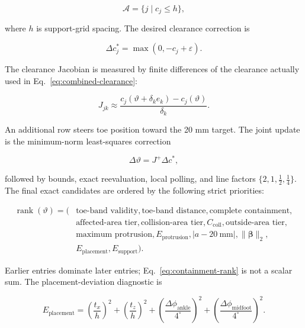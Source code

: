 \documentclass[11pt]{article}
\begin{document}
\begin{equation}
  \mathcal A=\{j\mid c_j\le h\},
\end{equation}

where $h$ is support-grid spacing. The desired clearance correction is

\begin{equation}
  \Delta c_j^*=\max(0,-c_j+\varepsilon).
\end{equation}

The clearance Jacobian is measured by finite differences of the clearance actually used
in Eq.~\eqref{eq:combined-clearance}:

\begin{equation}
  J_{jk}\approx
  \frac{c_j(\vartheta+\delta_k e_k)-c_j(\vartheta)}{\delta_k}.
\end{equation}

An additional row steers toe position toward the 20 mm target. The joint update is the
minimum-norm least-squares correction

\begin{equation}
  \Delta\vartheta = J^+\Delta c^*,
  \label{eq:containment-update}
\end{equation}

followed by bounds, exact reevaluation, local polling, and line factors
$\{2,1,\tfrac12,\tfrac14\}$. The final exact candidates are ordered by the following
strict priorities:

\begin{equation}
\begin{aligned}
\operatorname{rank}(\vartheta)=(&
\text{toe-band validity},
\text{toe-band distance},
\text{complete containment},\\
&\text{affected-area tier},
\text{collision-area tier},
C_{\mathrm{coll}},
\text{outside-area tier},\\
&\text{maximum protrusion},
E_{\mathrm{protrusion}},
|a-20\ \mathrm{mm}|,
\|\boldsymbol\beta\|_2,\\
&E_{\mathrm{placement}},
E_{\mathrm{support}}).
\end{aligned}
\label{eq:containment-rank}
\end{equation}

Earlier entries dominate later entries; Eq.~\eqref{eq:containment-rank} is not a scalar
sum. The placement-deviation diagnostic is

\begin{equation}
  E_{\mathrm{placement}}=
  \left(\frac{t_x}{h}\right)^2+
  \left(\frac{t_z}{h}\right)^2+
  \left(\frac{\Delta\phi_{\mathrm{ankle}}}{4^\circ}\right)^2+
  \left(\frac{\Delta\phi_{\mathrm{midfoot}}}{4^\circ}\right)^2.
\end{equation}
\end{document}
